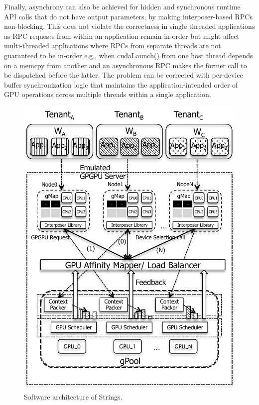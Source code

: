 Finally, asynchrony can also be achieved for hidden and synchronous runtime API calls that do not have output parameters, by making interposer-based RPCs non-blocking. This does not violate the correctness in single threaded applications as RPC requests from within an application remain in-order but might affect multi-threaded applications where RPCs from separate threads are not guaranteed to be in-order e.g., when cudaLaunch() from one host thread depends on a memcpy from another and an asynchronous RPC makes the former call to be dispatched before the latter. The problem can be corrected with per-device buffer synchronization logic that maintains the application-intended order of GPU operations across multiple threads within a single application.
\begin{figure}[!t]
\centering
\includegraphics{figures/strings_archi1.pdf}
\caption{Software architecture of Strings.}
\label{fig:strings_archi}
\end{figure}
